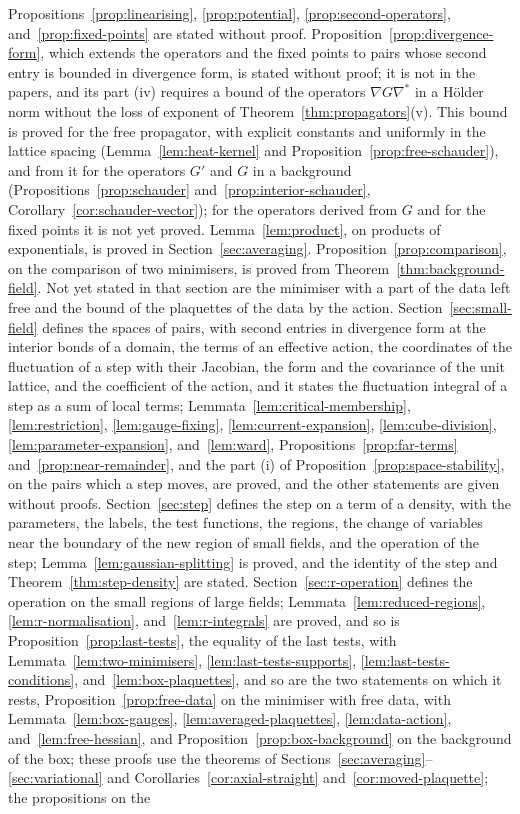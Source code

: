 \documentclass[11pt]{preprint}
\numberwithin{equation}{section}
\begin{document}
Propositions~\ref{prop:linearising}, \ref{prop:potential}, \ref{prop:second-operators}, and~\ref{prop:fixed-points} are stated without proof. Proposition~\ref{prop:divergence-form}, which extends the operators and the fixed points to pairs whose second entry is bounded in divergence form, is stated without proof; it is not in the papers, and its part (iv) requires a bound of the operators $\nabla G\nabla^*$ in a H\"older norm without the loss of exponent of Theorem~\ref{thm:propagators}(v). This bound is proved for the free propagator, with explicit constants and uniformly in the lattice spacing (Lemma~\ref{lem:heat-kernel} and Proposition~\ref{prop:free-schauder}), and from it for the operators $G'$ and $G$ in a background (Propositions~\ref{prop:schauder} and~\ref{prop:interior-schauder}, Corollary~\ref{cor:schauder-vector}); for the operators derived from $G$ and for the fixed points it is not yet proved. Lemma~\ref{lem:product}, on products of exponentials, is proved in Section~\ref{sec:averaging}. Proposition~\ref{prop:comparison}, on the comparison of two minimisers, is proved from Theorem~\ref{thm:background-field}. Not yet stated in that section are the minimiser with a part of the data left free and the bound of the plaquettes of the data by the action. Section~\ref{sec:small-field} defines the spaces of pairs, with second entries in divergence form at the interior bonds of a domain, the terms of an effective action, the coordinates of the fluctuation of a step with their Jacobian, the form and the covariance of the unit lattice, and the coefficient of the action, and it states the fluctuation integral of a step as a sum of local terms; Lemmata~\ref{lem:critical-membership}, \ref{lem:restriction}, \ref{lem:gauge-fixing}, \ref{lem:current-expansion}, \ref{lem:cube-division}, \ref{lem:parameter-expansion}, and~\ref{lem:ward}, Propositions~\ref{prop:far-terms} and~\ref{prop:near-remainder}, and the part (i) of Proposition~\ref{prop:space-stability}, on the pairs which a step moves, are proved, and the other statements are given without proofs. Section~\ref{sec:step} defines the step on a term of a density, with the parameters, the labels, the test functions, the regions, the change of variables near the boundary of the new region of small fields, and the operation of the step; Lemma~\ref{lem:gaussian-splitting} is proved, and the identity of the step and Theorem~\ref{thm:step-density} are stated. Section~\ref{sec:r-operation} defines the operation on the small regions of large fields; Lemmata~\ref{lem:reduced-regions}, \ref{lem:r-normalisation}, and~\ref{lem:r-integrals} are proved, and so is Proposition~\ref{prop:last-tests}, the equality of the last tests, with Lemmata~\ref{lem:two-minimisers}, \ref{lem:last-tests-supports}, \ref{lem:last-tests-conditions}, and~\ref{lem:box-plaquettes}, and so are the two statements on which it rests, Proposition~\ref{prop:free-data} on the minimiser with free data, with Lemmata~\ref{lem:box-gauges}, \ref{lem:averaged-plaquettes}, \ref{lem:data-action}, and~\ref{lem:free-hessian}, and Proposition~\ref{prop:box-background} on the background of the box; these proofs use the theorems of Sections~\ref{sec:averaging}--\ref{sec:variational} and Corollaries~\ref{cor:axial-straight} and~\ref{cor:moved-plaquette}; the propositions on the 
\end{document}
